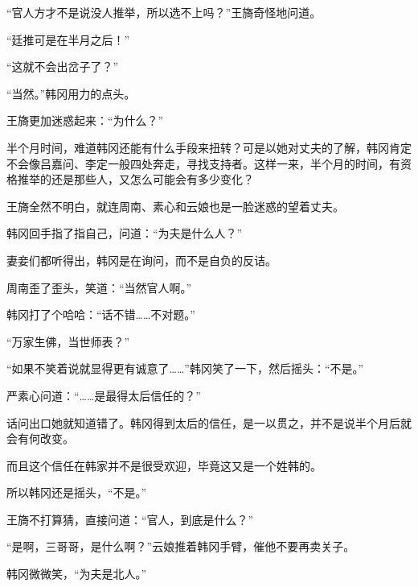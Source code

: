 “官人方才不是说没人推举，所以选不上吗？”王旖奇怪地问道。

“廷推可是在半月之后！”

“这就不会出岔子了？”

“当然。”韩冈用力的点头。

王旖更加迷惑起来：“为什么？”

半个月时间，难道韩冈还能有什么手段来扭转？可是以她对丈夫的了解，韩冈肯定不会像吕嘉问、李定一般四处奔走，寻找支持者。这样一来，半个月的时间，有资格推举的还是那些人，又怎么可能会有多少变化？

王旖全然不明白，就连周南、素心和云娘也是一脸迷惑的望着丈夫。

韩冈回手指了指自己，问道：“为夫是什么人？”

妻妾们都听得出，韩冈是在询问，而不是自负的反诘。

周南歪了歪头，笑道：“当然官人啊。”

韩冈打了个哈哈：“话不错……不对题。”

“万家生佛，当世师表？”

“如果不笑着说就显得更有诚意了……”韩冈笑了一下，然后摇头：“不是。”

严素心问道：“……是最得太后信任的？”

话问出口她就知道错了。韩冈得到太后的信任，是一以贯之，并不是说半个月后就会有何改变。

而且这个信任在韩家并不是很受欢迎，毕竟这又是一个姓韩的。

所以韩冈还是摇头，“不是。”

王旖不打算猜，直接问道：“官人，到底是什么？”

“是啊，三哥哥，是什么啊？”云娘推着韩冈手臂，催他不要再卖关子。

韩冈微微笑，“为夫是北人。”